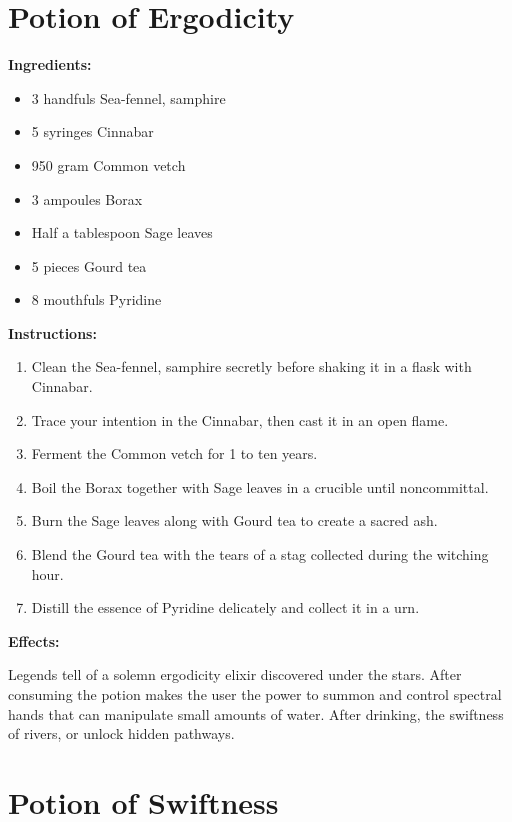 \documentclass{article}
\begin{document}
\newpage
\section*{Potion of Ergodicity}

\textbf{Ingredients:}

\begin{itemize}
  \item 3 handfuls Sea-fennel, samphire
  \item 5 syringes Cinnabar
  \item 950 gram Common vetch
  \item 3 ampoules Borax
  \item Half a tablespoon Sage leaves
  \item 5 pieces Gourd tea
  \item 8 mouthfuls Pyridine
\end{itemize}

\textbf{Instructions:}

\begin{enumerate}
  \item Clean the Sea-fennel, samphire secretly before shaking it in a flask with Cinnabar.
  \item Trace your intention in the Cinnabar, then cast it in an open flame.
  \item Ferment the Common vetch for 1 to ten years.
  \item Boil the Borax together with Sage leaves in a crucible until noncommittal.
  \item Burn the Sage leaves along with Gourd tea to create a sacred ash.
  \item Blend the Gourd tea with the tears of a stag collected during the witching hour.
  \item Distill the essence of Pyridine delicately and collect it in a urn.
\end{enumerate}

\textbf{Effects:}

Legends tell of a solemn ergodicity elixir discovered under the stars. After consuming the potion makes the user the power to summon and control spectral hands that can manipulate small amounts of water. After drinking, the swiftness of rivers, or unlock hidden pathways.

\newpage
\section*{Potion of Swiftness}
\end{document}
